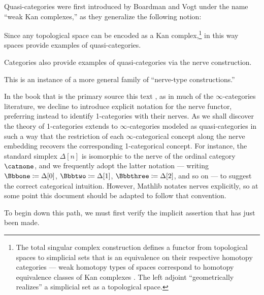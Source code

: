   Quasi-categories were first introduced by Boardman and Vogt \cite{BoardmanVogt:1973hi} under the name ``weak Kan complexes,'' as they generalize the following notion:


Since any topological space can be encoded as a Kan complex,\footnote{The total singular complex construction defines a functor from topological spaces to simplicial sets that is an equivalence on their respective homotopy categories --- weak homotopy types of spaces correspond to homotopy equivalence classes of Kan complexes \cite[\S II.2]{Quillen:1967ha}. The left adjoint %
    ``geometrically realizes'' a simplicial set as a topological space.}
in this way spaces provide examples of quasi-categories.

Categories also provide examples of quasi-categories via the nerve construction.




 This is an instance of a more general family of ``nerve-type constructions.'' %


 In the book that is the primary source this text \cite{RiehlVerity:2022eo}, as in much of the $\infty$-categories literature, we decline to introduce explicit notation for the nerve functor, preferring instead to identify 1-categories with their nerves. As we shall discover the theory of 1-categories extends to $\infty$-categories modeled as quasi-categories in such a way that the restriction of each $\infty$-categorical concept along the nerve embedding recovers the corresponding 1-categorical concept. For instance, the standard simplex $\Delta[n]$ is isomorphic to the nerve of the ordinal category $\catnone$, and we frequently adopt the latter notation --- writing $\catone \coloneq \Delta[0]$, $\cattwo \coloneq \Delta[1]$, $\catthree \coloneq \Delta[2]$, and so on --- to suggest the correct categorical intuition. However, Mathlib notates nerves explicitly, so at some point this document should be adapted to follow that convention.

 To begin down this path, we must first verify the implicit assertion that has just been made.


